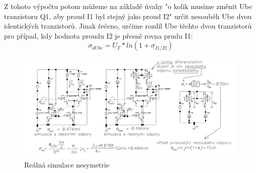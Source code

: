 Z tohoto výpočtu potom můžeme na základě úvahy "o kolik musíme změnit Ube tranzistoru Q1, aby proud I1 byl stejný jako proud I2" určit nesouběh Ube dvou identických tranzistorů. Jinak řečeno, určíme rozdíl Ube těchto dvou tranzistorů pro případ, kdy hodnota proudu I2 je přesně rovna prudu I1:
\begin{equation}
\sigma_{dUbe} = U_{T}*ln(1+\sigma_{I1/I2})
\end{equation}

\begin{figure}[h]
   \begin{center}
     \includegraphics[scale=0.4]{images/Soubeh.png}
   \end{center}
   \caption{Reálná simulace nesymetrie}
\end{figure}

























